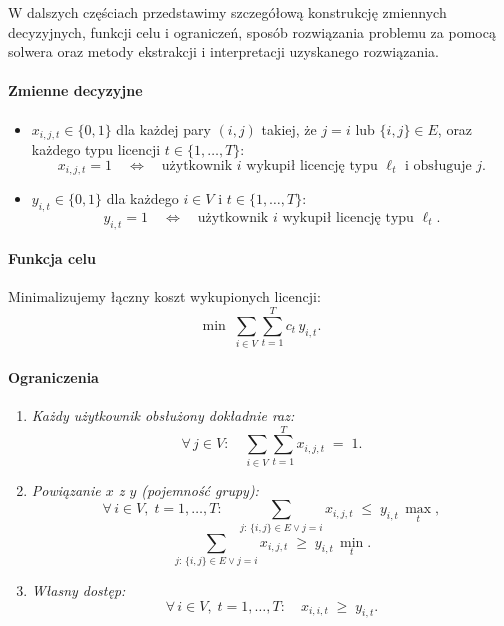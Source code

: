 W dalszych częściach przedstawimy szczegółową konstrukcję zmiennych decyzyjnych, funkcji celu i ograniczeń, sposób rozwiązania problemu za pomocą solwera oraz metody ekstrakcji i interpretacji uzyskanego rozwiązania.  

\paragraph{Zmienne decyzyjne}  
\begin{itemize}
  \item $x_{i,j,t}\in\{0,1\}$ dla każdej pary $(i,j)$ takiej, że $j=i$ lub $\{i,j\}\in E$, oraz każdego typu licencji $t\in\{1,\dots,T\}$:
  \[
    x_{i,j,t}=1
    \quad\Longleftrightarrow\quad
    \text{użytkownik }i\text{ wykupił licencję typu }\ell_t\text{ i obsługuje }j.
  \]
  \item $y_{i,t}\in\{0,1\}$ dla każdego $i\in V$ i $t\in\{1,\dots,T\}$:
  \[
    y_{i,t}=1
    \quad\Longleftrightarrow\quad
    \text{użytkownik }i\text{ wykupił licencję typu }\ell_t.
  \]
\end{itemize}

\paragraph{Funkcja celu}  
Minimalizujemy łączny koszt wykupionych licencji:
\[
  \min \;\sum_{i\in V}\sum_{t=1}^T c_t\,y_{i,t}.
\]

\paragraph{Ograniczenia}
\begin{enumerate}
  \item \emph{Każdy użytkownik obsłużony dokładnie raz:}
  \[
    \forall\,j\in V:\quad
    \sum_{i\in V}\sum_{t=1}^T x_{i,j,t} \;=\; 1.
  \]
  \item \emph{Powiązanie $x$ z $y$ (pojemność grupy):}
  \[
    \forall\,i\in V,\;t=1,\dots,T:\quad
    \sum_{j:\,\{i,j\}\in E\lor j=i} x_{i,j,t}
    \;\le\;
    y_{i,t}\,\max_t,
  \]
  \[
    \sum_{j:\,\{i,j\}\in E\lor j=i} x_{i,j,t}
    \;\ge\;
    y_{i,t}\,\min_t.
  \]
  \item \emph{Własny dostęp:}
  \[
    \forall\,i\in V,\;t=1,\dots,T:\quad
    x_{i,i,t}\;\ge\;y_{i,t}.
  \]
\end{enumerate}

